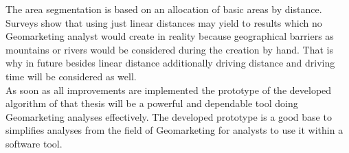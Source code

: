 The area segmentation is based on an allocation of basic areas by distance. Surveys show that using just linear distances may yield to results which no Geomarketing analyst would create in reality because geographical barriers as mountains or rivers would be considered during the creation by hand. That is why in future besides linear distance additionally driving distance and driving time will be considered as well. \\
As soon as all improvements are implemented the prototype of the developed algorithm of that thesis will be a powerful and dependable tool doing Geomarketing analyses effectively. The developed prototype is a good base to simplifies analyses from the field of Geomarketing for analysts to use it within a software tool.
